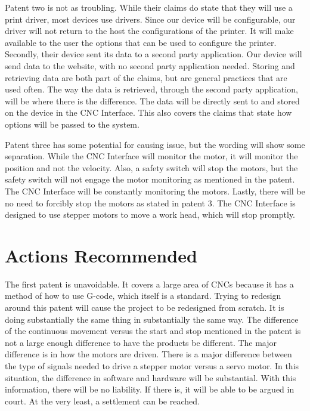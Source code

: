 Patent two is not as troubling. 
While their claims do state that they will use a print driver, most devices use drivers. 
Since our device will be configurable, our driver will not return to the host the configurations of the printer.  
It will make available to the user the options that can be used to configure the printer. 
Secondly, their device sent its data to a second party application. 
Our device will send data to the website, with no second party application needed. 
Storing and retrieving data are both part of the claims, but are general practices that are used often.  
The way the data is retrieved, through the second party application, will be where there is the difference. 
The data will be directly sent to and stored on the device in the CNC Interface. 
This also covers the claims that state how options will be passed to the system.


Patent three has some potential for causing issue, but the wording will show some separation. 
While the CNC Interface will monitor the motor, it will monitor the position and not the velocity. 
Also, a safety switch will stop the motors, but the safety switch will not engage the motor monitoring as mentioned in the patent. 
The CNC Interface will be constantly monitoring the motors. 
Lastly, there will be no need to forcibly stop the motors as stated in patent 3. 
The CNC Interface is designed to use stepper motors to move a work head, which will stop promptly.

\section{Actions Recommended}


The first patent is unavoidable.
It covers a large area of CNCs because it has a method of how to use G-code, which itself is a standard. 
Trying to redesign around this patent will cause the project to be redesigned from scratch.  
It is doing substantially the same thing in substantially the same way. 
The difference of the continuous movement versus the start and stop mentioned in the patent is not a large enough difference to have the products be different.  
The major difference is in how the motors are driven.  
There is a major difference between the type of signals needed to drive a stepper motor versus a servo motor. 
In this situation, the difference in software and hardware will be substantial. 
With this information, there will be no liability. 
If there is, it will be able to be argued in court. 
At the very least, a settlement can be reached.



